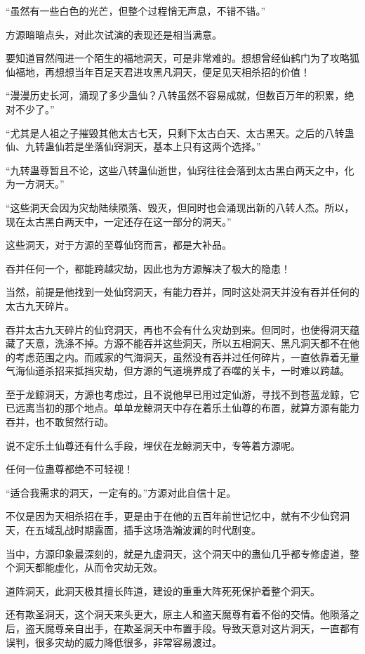 \begin{this_body}
“虽然有一些白色的光芒，但整个过程悄无声息，不错不错。”

方源暗暗点头，对此次试演的表现还是相当满意。

要知道冒然闯进一个陌生的福地洞天，可是非常难的。想想曾经仙鹤门为了攻略狐仙福地，再想想当年百足天君进攻黑凡洞天，便足见天相杀招的价值！

“漫漫历史长河，涌现了多少蛊仙？八转虽然不容易成就，但数百万年的积累，绝对不少了。”

“尤其是人祖之子摧毁其他太古七天，只剩下太古白天、太古黑天。之后的八转蛊仙、九转蛊仙若是坐落仙窍洞天，基本上只有这两个选择。”

“九转蛊尊暂且不论，这些八转蛊仙逝世，仙窍往往会落到太古黑白两天之中，化为一方洞天。”

“这些洞天会因为灾劫陆续陨落、毁灭，但同时也会涌现出新的八转人杰。所以，现在太古黑白两天中，一定还存在这一部分的洞天。”

这些洞天，对于方源的至尊仙窍而言，都是大补品。

吞并任何一个，都能跨越灾劫，因此也为方源解决了极大的隐患！

当然，前提是他找到一处仙窍洞天，有能力吞并，同时这处洞天并没有吞并任何的太古九天碎片。

吞并太古九天碎片的仙窍洞天，再也不会有什么灾劫到来。但同时，也使得洞天蕴藏了天意，洗涤不掉。方源不能吞并这些洞天，所以五相洞天、黑凡洞天都不在他的考虑范围之内。而戚家的气海洞天，虽然没有吞并过任何碎片，一直依靠着无量气海仙道杀招来抵挡灾劫，但方源的气道境界成了吞噬的关卡，一时难以跨越。

至于龙鲸洞天，方源也考虑过，且不说他早已用过定仙游，寻找不到苍蓝龙鲸，它已远离当初的那个地点。单单龙鲸洞天中存在着乐土仙尊的布置，就算方源有能力吞并，也不敢贸然行动。

说不定乐土仙尊还有什么手段，埋伏在龙鲸洞天中，专等着方源呢。

任何一位蛊尊都绝不可轻视！

“适合我需求的洞天，一定有的。”方源对此自信十足。

不仅是因为天相杀招在手，更是由于在他的五百年前世记忆中，就有不少仙窍洞天，在五域乱战时期露面，插手这场浩瀚波澜的时代剧变。

当中，方源印象最深刻的，就是九虚洞天，这个洞天中的蛊仙几乎都专修虚道，整个洞天都能虚化，从而令灾劫无效。

道阵洞天，此洞天极其擅长阵道，建设的重重大阵死死保护着整个洞天。

还有欺圣洞天，这个洞天来头更大，原主人和盗天魔尊有着不俗的交情。他陨落之后，盗天魔尊亲自出手，在欺圣洞天中布置手段。导致天意对这片洞天，一直都有误判，很多灾劫的威力降低很多，非常容易渡过。


\end{this_body}
